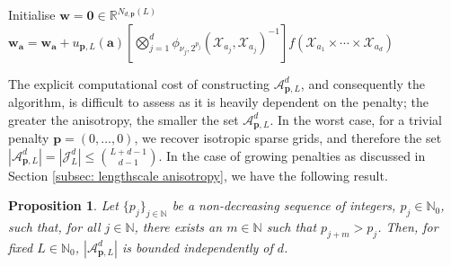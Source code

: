 \documentclass[pdflatex,sn-mathphys-num]{sn-jnl}%
\theoremstyle{thmstyleone}%
\newtheorem{proposition}{Proposition}%
\theoremstyle{thmstyletwo}%
\theoremstyle{thmstylethree}%
\begin{document}
\begin{algorithm}[h]
\caption{Fast inference algorithm for lengthscale-informed sparse grids.}
    \begin{algorithmic}
    \State Initialise $\mathbf{w}=\mathbf{0}\in\mathbb{R}^{N_{d,\mathbf{p}}(L)}$
        \State $\mathbf{w}_{\mathbf{a}}=\mathbf{w}_{\mathbf{a}} + u_{\mathbf{p},L}(\mathbf{a})\left[\bigotimes_{j=1}^d\phi_{\nu_j,2^{p_j}}(\mathcal{X}_{a_j},\mathcal{X}_{a_j})^{-1}\right]f(\mathcal{X}_{a_1}\times\cdots\times\mathcal{X}_{a_d})$ 
    \EndFor
    \end{algorithmic}
\label{alg: 1}
\end{algorithm}
The explicit computational cost of constructing \(\mathcal{A}_{\mathbf{p},L}^d\), and consequently the algorithm, is difficult to assess as it is heavily dependent on the penalty; the greater the anisotropy, the smaller the set \(\mathcal{A}_{\mathbf{p},L}^d\). In the worst case, for a trivial penalty \(\mathbf{p}=(0,\dots,0)\), we recover isotropic sparse grids, and therefore the set \(|\mathcal{A}_{\mathbf{p},L}^d|=|\mathcal{J}_L^d|\leq\binom{L+d-1}{d-1}\). In the case of growing penalties as discussed in Section \ref{subsec: lengthscale anisotropy}, we have the following result.

\begin{proposition}
    Let \(\{p_j\}_{j\in\mathbb{N}}\) be a non-decreasing sequence of integers, \(p_j\in\mathbb{N}_0\), such that, for all \(j\in\mathbb{N}\), there exists an \(m\in\mathbb{N}\) such that \(p_{j+m}>p_j\). Then, for fixed \(L\in\mathbb{N}_0\), \(|\mathcal{A}_{\mathbf{p},L}^d|\) is bounded independently of \(d\).
\end{proposition}
\end{document}
